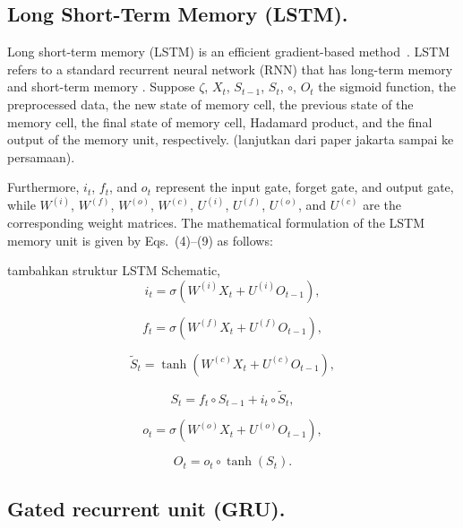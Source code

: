 \documentclass[pdflatex,sn-mathphys-num]{sn-jnl}%
\theoremstyle{thmstyleone}%
\theoremstyle{thmstyletwo}%
\theoremstyle{thmstylethree}%
\begin{document}
\subsection{Long Short-Term Memory (LSTM).}
Long short-term memory (LSTM) is an efficient gradient-based method~\cite{Handhayani2023}. LSTM refers to a standard recurrent neural network (RNN) that has long-term memory and short-term memory \cite{hochreiter1997long} . Suppose $\zeta$, $X_{t}$, $S_{t-1}$, $S_t$, $\circ$, $O_t$ the sigmoid function, the preprocessed data, the new state of memory cell, the previous state of the memory cell, the final state of memory cell, Hadamard product, and the final output of the memory unit, respectively. (lanjutkan dari paper jakarta sampai ke persamaan).

Furthermore, $i_t$, $f_t$, and $o_t$ represent the input gate, forget gate,  and output gate, while $W^{(i)}$, $W^{(f)}$, $W^{(o)}$, $W^{(c)}$,  $U^{(i)}$, $U^{(f)}$, $U^{(o)}$, and $U^{(c)}$ are the corresponding weight matrices.  The mathematical formulation of the LSTM memory unit is given by Eqs.~(4)--(9) as follows:

tambahkan struktur LSTM Schematic,
\begin{equation}
i_t = \sigma \left( W^{(i)} X_t + U^{(i)} O_{t-1} \right),
\tag{4}
\end{equation}

\begin{equation}
f_t = \sigma \left( W^{(f)} X_t + U^{(f)} O_{t-1} \right),
\tag{5}
\end{equation}

\begin{equation}
\tilde{S}_t = \tanh \left( W^{(c)} X_t + U^{(c)} O_{t-1} \right),
\tag{6}
\end{equation}

\begin{equation}
S_t = f_t \circ S_{t-1} + i_t \circ \tilde{S}_t,
\tag{7}
\end{equation}

\begin{equation}
o_t = \sigma \left( W^{(o)} X_t + U^{(o)} O_{t-1} \right),
\tag{8}
\end{equation}

\begin{equation}
O_t = o_t \circ \tanh (S_t).
\tag{9}
\end{equation}

\subsection{Gated recurrent unit (GRU).}
\end{document}

